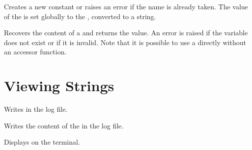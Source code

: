 \documentclass[oneside]{book}
\begin{document}
\begin{function}{\StrConst}
\begin{syntax}
  
\end{syntax}
Creates a new constant  or raises an error if the name
is already taken.  The value of the  is set
globally to the , converted to a string.
\begin{codehigh}
\StrConst {}
\end{codehigh}
\end{function}

\begin{function}{\StrUse}
\begin{syntax}
 
\end{syntax}
Recovers the content of a  and returns the value.
An error is raised if the variable
does not exist or if it is invalid. Note that it is possible to use
a  directly without an accessor function.
\begin{codehigh}
\StrUse \lTmpaStr
\end{codehigh}
\end{function}

\section{Viewing Strings}

\begin{function}{\StrLog}
\begin{syntax}
 
\end{syntax}
Writes  in the log file.
\begin{codehigh}
\end{codehigh}
\end{function}

\begin{function}{\StrVarLog}
\begin{syntax}
 
\end{syntax}
Writes the content of the  in the log file.
\begin{codehigh}
\StrSet {}
\StrVarLog \lTmpiStr
\end{codehigh}
\end{function}

\begin{function}{\StrShow}
\begin{syntax}
 
\end{syntax}
Displays  on the terminal.
\begin{codehigh}
\end{codehigh}
\end{function}
\end{document}
